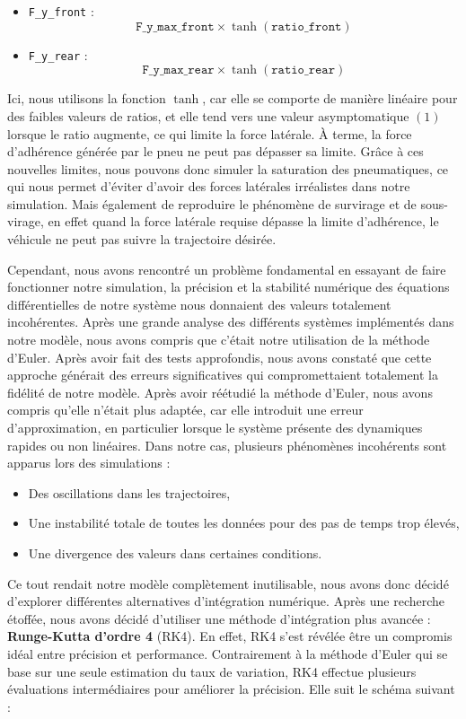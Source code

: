 \begin{itemize}
    \item \texttt{F\_y\_front} : $$\texttt{F\_y\_max\_front} \times \tanh(\texttt{ratio\_front})$$
    \item \texttt{F\_y\_rear} : $$\texttt{F\_y\_max\_rear} \times \tanh(\texttt{ratio\_rear})$$
\end{itemize}

Ici, nous utilisons la fonction $\tanh$, car elle se comporte de manière linéaire pour des faibles valeurs de ratios, et elle tend vers une valeur asymptomatique $(1)$ lorsque le ratio augmente, ce qui limite la force latérale. À terme, la force d'adhérence générée par le pneu ne peut pas dépasser sa limite. Grâce à ces nouvelles limites, nous pouvons donc simuler la saturation des pneumatiques, ce qui nous permet d'éviter d'avoir des forces latérales irréalistes dans notre simulation. Mais également de reproduire le phénomène de survirage et de sous-virage, en effet quand la force latérale requise dépasse la limite d'adhérence, le véhicule ne peut pas suivre la trajectoire désirée.

Cependant, nous avons rencontré un problème fondamental en essayant de faire fonctionner notre simulation, la précision et la stabilité numérique des équations différentielles de notre système nous donnaient des valeurs totalement incohérentes. Après une grande analyse des différents systèmes implémentés dans notre modèle, nous avons compris que c'était notre utilisation de la méthode d'Euler. Après avoir fait des tests approfondis, nous avons constaté que cette approche générait des erreurs significatives qui compromettaient totalement la fidélité de notre modèle. Après avoir réétudié la méthode d'Euler, nous avons compris qu'elle n'était plus adaptée, car elle introduit une erreur d'approximation, en particulier lorsque le système présente des dynamiques rapides ou non linéaires. Dans notre cas, plusieurs phénomènes incohérents sont apparus lors des simulations :
\begin{itemize}
    \item Des oscillations dans les trajectoires,
    \item Une instabilité totale de toutes les données pour des pas de temps trop élevés,
    \item Une divergence des valeurs dans certaines conditions.
\end{itemize}
Ce tout rendait notre modèle complètement inutilisable, nous avons donc décidé d'explorer différentes alternatives d'intégration numérique.
Après une recherche étoffée, nous avons décidé d'utiliser une méthode d'intégration plus avancée : \textbf{Runge-Kutta d'ordre 4} (RK4).
En effet, RK4 s'est révélée être un compromis idéal entre précision et performance.
Contrairement à la méthode d'Euler qui se base sur une seule estimation du taux de variation, RK4 effectue plusieurs évaluations intermédiaires pour améliorer la précision.
Elle suit le schéma suivant :

